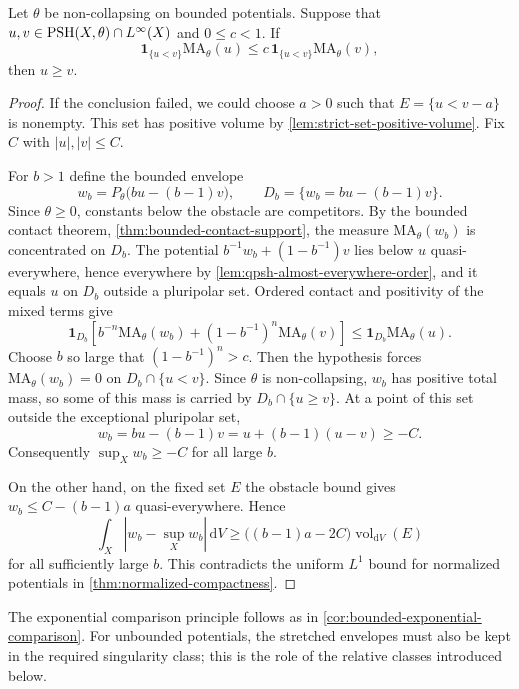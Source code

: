\begin{theorem}[Guedj--Lu]\label{thm:semipositive-bounded-domination}
Let $\theta$ be non-collapsing on bounded potentials. Suppose that $u,v\in\mathrm{PSH}(X,\theta)\cap L^\infty(X)$ and $0\leq c<1$. If
\[
 \mathbf1_{\{u<v\}}\mathrm{MA}_\theta(u)
 \leq c\,\mathbf1_{\{u<v\}}\mathrm{MA}_\theta(v),
\]
then $u\geq v$.
\end{theorem}
\begin{proof}
If the conclusion failed, we could choose $a>0$ such that $E=\{u<v-a\}$ is nonempty. This set has positive volume by \cref{lem:strict-set-positive-volume}. Fix $C$ with $|u|,|v|\leq C$.

For $b>1$ define the bounded envelope
\[
 w_b=P_\theta\bigl(bu-(b-1)v\bigr),\qquad
 D_b=\{w_b=bu-(b-1)v\}.
\]
Since $\theta\geq0$, constants below the obstacle are competitors. By the bounded contact theorem, \cref{thm:bounded-contact-support}, the measure $\mathrm{MA}_\theta(w_b)$ is concentrated on $D_b$. The potential
$b^{-1}w_b+(1-b^{-1})v$ lies below $u$ quasi-everywhere, hence everywhere by \cref{lem:qpsh-almost-everywhere-order}, and it equals $u$ on $D_b$ outside a pluripolar set. Ordered contact and positivity of the mixed terms give
\[
 \mathbf1_{D_b}\left[b^{-n}\mathrm{MA}_\theta(w_b)
              +(1-b^{-1})^n\mathrm{MA}_\theta(v)\right]
 \leq\mathbf1_{D_b}\mathrm{MA}_\theta(u).
\]
Choose $b$ so large that $(1-b^{-1})^n>c$. Then the hypothesis forces $\mathrm{MA}_\theta(w_b)=0$ on $D_b\cap\{u<v\}$. Since $\theta$ is non-collapsing, $w_b$ has positive total mass, so some of this mass is carried by $D_b\cap\{u\geq v\}$. At a point of this set outside the exceptional pluripolar set,
\[
 w_b=bu-(b-1)v=u+(b-1)(u-v)\geq-C.
\]
Consequently $\sup_Xw_b\geq-C$ for all large $b$.

On the other hand, on the fixed set $E$ the obstacle bound gives
$w_b\leq C-(b-1)a$ quasi-everywhere. Hence
\[
 \int_X|w_b-\sup_Xw_b|\,\mathrm{d}V
 \geq\bigl((b-1)a-2C\bigr)\operatorname{vol}_{\mathrm{d}V}(E)
\]
for all sufficiently large $b$. This contradicts the uniform $L^1$ bound for normalized potentials in \cref{thm:normalized-compactness}.
\end{proof}

The exponential comparison principle follows as in \cref{cor:bounded-exponential-comparison}. For unbounded potentials, the stretched envelopes must also be kept in the required singularity class; this is the role of the relative classes introduced below.

